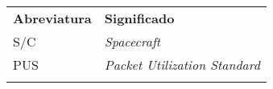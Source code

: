 
\begin{tabular}{p{}p{}}
    \textbf{Abreviatura} & \textbf{Significado}\\
    S/C & \textit{Spacecraft} \\
    PUS & \textit{Packet Utilization Standard} \\
     &
\end{tabular}
